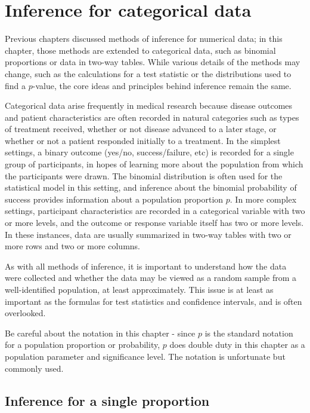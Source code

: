 
\chapter{Inference for categorical data}
\label{inferenceForCategoricalData}

Previous chapters discussed methods of inference for numerical data; in this chapter, those methods are extended to categorical data, such as binomial proportions or data in two-way tables. While various details of the methods may change, such as the calculations for a test statistic or the distributions used to find a $p$-value, the core ideas and principles behind inference remain the same.  

Categorical data arise frequently in medical research because disease outcomes and patient characteristics are often recorded in natural categories such as types of treatment received, whether or not disease advanced to a later stage, or whether or not a patient responded initially to a treatment. In the simplest settings, a binary outcome (yes/no, success/failure, etc)  is recorded for a single group of participants, in hopes of learning more about the population from which the participants were drawn.  The binomial distribution is often used for the statistical model in this setting, and inference about the binomial probability of success provides information about a population proportion $p$.   In more complex settings, participant characteristics are recorded in a categorical variable with two or more levels, and the outcome or response variable itself has two or more levels.  In these instances, data are usually summarized in two-way tables with two or more rows and two or more columns.

As with all methods of inference, it is important to understand how the data were collected and whether the data may be viewed as a random sample from a well-identified population, at least approximately.  This issue is at least as important as the formulas for test statistics and confidence intervals, and is often overlooked.

Be careful about the notation in this chapter - since $p$ is the standard notation for a population proportion or probability, $p$ does double duty in this chapter as a population parameter and significance level.  The notation is unfortunate but commonly used.

\section{Inference for a single proportion}
\label{singleProportion}

